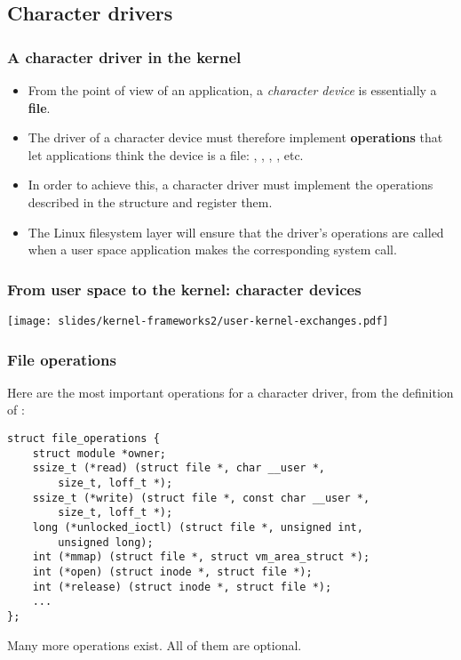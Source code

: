 \subsection{Character drivers}

\begin{frame}
  \frametitle{A character driver in the kernel}
  \begin{itemize}
  \item From the point of view of an application, a {\em character
      device} is essentially a {\bf file}.
  \item The driver of a character device must therefore implement {\bf
      operations} that let applications think the device is a file:
    , , , , etc.
  \item In order to achieve this, a character driver must implement
    the operations described in the 
    structure and register them.
  \item The Linux filesystem layer will ensure that the driver's
    operations are called when a user space application makes the
    corresponding system call.
  \end{itemize}
\end{frame}

\begin{frame}
  \frametitle{From user space to the kernel: character devices}
  \begin{center}
    \texttt{[image: slides/kernel-frameworks2/user-kernel-exchanges.pdf]}
  \end{center}
\end{frame}

\begin{frame}[fragile]
  \frametitle{File operations}
  Here are the most important operations for a character
  driver, from the definition of :
\begin{verbatim}
struct file_operations {
    struct module *owner;
    ssize_t (*read) (struct file *, char __user *,
        size_t, loff_t *);
    ssize_t (*write) (struct file *, const char __user *,
        size_t, loff_t *);
    long (*unlocked_ioctl) (struct file *, unsigned int,
        unsigned long);
    int (*mmap) (struct file *, struct vm_area_struct *);
    int (*open) (struct inode *, struct file *);
    int (*release) (struct inode *, struct file *);
    ...
};
\end{verbatim}
Many more operations exist. All of them are optional.
\end{frame}

